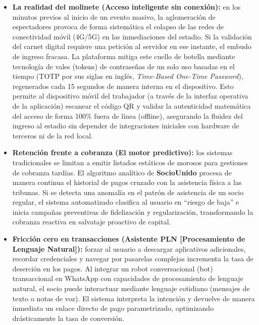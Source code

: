 \begin{itemize}
    \item \textbf{La realidad del molinete (Acceso inteligente sin conexión):} en los minutos previos al inicio de un evento masivo, la aglomeración de espectadores provoca de forma sistemática el colapso de las redes de conectividad móvil (4G/5G) en las inmediaciones del estadio. Si la validación del carnet digital requiere una petición al servidor en ese instante, el embudo de ingreso fracasa. La plataforma mitiga este cuello de botella mediante tecnología de vales (tokens) de contraseñas de un solo uso basadas en el tiempo (TOTP por sus siglas en inglés, \textit{Time-Based One-Time Password}), regenerados cada 15 segundos de manera interna en el dispositivo. Esto permite al dispositivo móvil del trabajador (a través de la interfaz operativa de la aplicación) escanear el código QR y validar la autenticidad matemática del acceso de forma 100\% fuera de línea (offline), asegurando la fluidez del ingreso al estadio sin depender de integraciones iniciales con hardware de terceros ni de la red local.
    \item \textbf{Retención frente a cobranza (El motor predictivo):} los sistemas tradicionales se limitan a emitir listados estáticos de morosos para gestiones de cobranza tardías. El algoritmo analítico de \textbf{SocioUnido} procesa de manera continua el historial de pagos cruzado con la asistencia física a las tribunas. Si se detecta una anomalía en el patrón de asistencia de un socio regular, el sistema automatizado clasifica al usuario en ``riesgo de baja'' e inicia campañas preventivas de fidelización y regularización, transformando la cobranza reactiva en salvataje proactivo de capital.
    \item \textbf{Fricción cero en transacciones (Asistente PLN [Procesamiento de Lenguaje Natural]):} forzar al usuario a descargar aplicativos adicionales, recordar credenciales y navegar por pasarelas complejas incrementa la tasa de deserción en los pagos. Al integrar un robot conversacional (bot) transaccional en WhatsApp con capacidades de procesamiento de lenguaje natural, el socio puede interactuar mediante lenguaje cotidiano (mensajes de texto o notas de voz). El sistema interpreta la intención y devuelve de manera inmediata un enlace directo de pago parametrizado, optimizando drásticamente la tasa de conversión.
\end{itemize}
